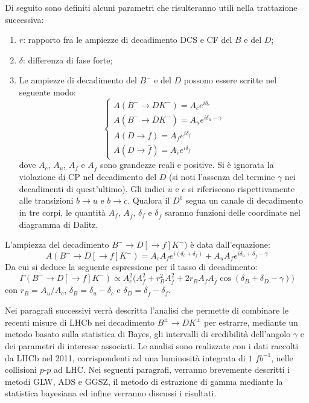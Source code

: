 Di seguito sono definiti alcuni parametri che risulteranno utili nella trattazione successiva:
\begin{enumerate}
 \item $r$: rapporto fra le ampiezze di decadimento DCS e CF del $B$ e del $D$;
 \item $\delta$: differenza di fase forte;
 \item Le ampiezze di decadimento del $B^-$ e del $D$ possono essere scritte nel seguente modo:
\begin{displaymath}
\left\{
\begin{array}{l}
A(B^- \rightarrow DK^-) = A_ce^{i\delta_c}\\
A(B^- \rightarrow \bar{D}K^-) = A_ue^{i\delta_u-\gamma}\\
A(D \rightarrow f) = A_fe^{i\delta_f}\\
A(D \rightarrow \bar{f}) = A_ce^{i\delta_{\bar{f}}}
\end{array}
\right.
\end{displaymath}
dove $A_c$, $A_u$, $A_f$ e $A_{\bar{f}}$ sono grandezze reali e positive. Si è ignorata la violazione di CP nel decadimento del $D$ (si noti l'assenza del termine $\gamma$
nei decadimenti di quest'ultimo). Gli indici $u$ e $c$ si riferiscono rispettivamente alle transizioni $b\rightarrow u$ e $b\rightarrow c$.
Qualora il $D^0$ segua un canale di decadimento in tre corpi, le quantità $A_f$, $A_{\bar{f}}$, $\delta_f$ e $\delta_{\bar{f}}$ saranno funzioni delle coordinate nel diagramma
di Dalitz.
\end{enumerate} 
L'ampiezza del decadimento $B^- \rightarrow D[\rightarrow f]K^-)$ è data dall'equazione:
\begin{equation}
 A (B^-\rightarrow D[\rightarrow f]K^-) = A_cA_fe^{i(\delta_c + \delta_f)} + A_u A_fe^{i\delta_u + \delta_{\bar{f}} - \gamma}
\end{equation}
Da cui si deduce la seguente espressione per il tasso di decadimento:
\begin{equation}\label{probability}
 \Gamma (B^-\rightarrow D[\rightarrow f]K^-) \propto A_c^2\big(A_f^2 + r_B^2A_{\bar{f}}^2 + 2r_BA_fA_{\bar{f}}\cos(\delta_B + \delta_D - \gamma)\big)
\end{equation}
con $r_B = A_u/A_c$, $\delta_B = \delta_u - \delta_c$ e $\delta_D = \delta_{\bar{f}} - \delta_f$.

Nei paragrafi successivi verrà descritta l'analisi che permette di combinare le recenti misure di LHCb nei decadimento $B^{\pm}\rightarrow DK^{\pm}$ 
\cite{LHCBB2}\cite{LHCBB3}\cite{LHCBB4} per estrarre, 
mediante un metodo basato sulla statistica di Bayes, gli intervalli di credibilità dell'angolo $\gamma$ e dei parametri di interesse associati. Le analisi sono 
realizzate con i dati raccolti da LHCb nel 2011, corrispondenti ad una luminosità integrata di $1$ $fb^{-1}$, nelle collisioni $p$-$p$ ad LHC.  Nei seguenti paragrafi,
verranno brevemente descritti i metodi GLW, ADS e GGSZ, il metodo di estrazione di gamma mediante la statistica bayesiana ed infine verranno discussi i risultati. 


